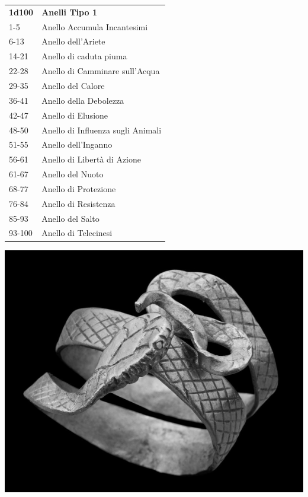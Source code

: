 \begin{multicols}{2}
\medskip

\begin{tabular}{ll}
\textbf{1d100} & \textbf{Anelli Tipo 1}\\
1-5   & Anello Accumula Incantesimi\\
6-13  & Anello dell'Ariete\\
14-21 & Anello di caduta piuma\\
22-28 & Anello di Camminare sull'Acqua\\
29-35 & Anello del Calore\\
36-41 & Anello della Debolezza\\
42-47 & Anello di Elusione\\
48-50 & Anello di Influenza sugli Animali\\
51-55 & Anello dell’Inganno\\
56-61 & Anello di Libertà di Azione\\
61-67 & Anello del Nuoto\\
68-77 & Anello di Protezione\\
76-84 & Anello di Resistenza\\
85-93 & Anello del Salto\\
93-100 & Anello di Telecinesi\\
\end{tabular}

\medskip

\begin{center}
\includegraphics[width=0.8\linewidth]{immagini/romanring.png}
\end{center}


\end{multicols}
